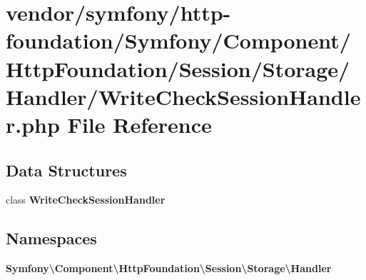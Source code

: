 \section{vendor/symfony/http-\/foundation/\+Symfony/\+Component/\+Http\+Foundation/\+Session/\+Storage/\+Handler/\+Write\+Check\+Session\+Handler.php File Reference}
\label{_write_check_session_handler_8php}
\subsection*{Data Structures}
\begin{DoxyCompactItemize}
\item 
class {\bf Write\+Check\+Session\+Handler}
\end{DoxyCompactItemize}
\subsection*{Namespaces}
\begin{DoxyCompactItemize}
\item 
 {\bf Symfony\textbackslash{}\+Component\textbackslash{}\+Http\+Foundation\textbackslash{}\+Session\textbackslash{}\+Storage\textbackslash{}\+Handler}
\end{DoxyCompactItemize}
